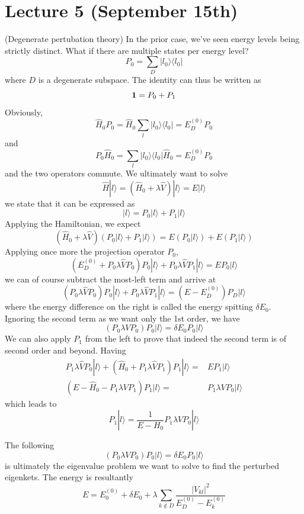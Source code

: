 \section{Lecture 5 (September 15th)}
\begin{defi}
(Degenerate pertubation theory) In the prior case, we've seen energy levels being strictly distinct. What if there are multiple states per energy level? 
\[P_{0}=\sum _{D}|l_{0}\rangle \langle l_{0}|\]
where $D$ is a degenerate subspace. The identity can thus be written as
\[{\bf 1}=P_0+P_1\]
Obviously,
\[\hat{H}_{0}P_0=\hat{H}_{0}\sum _{l}|l_{0}\rangle \langle l_{0}|=E_{D}^{(0)}P_0\]
and
\[P_0\hat{H}_{0}=\sum _{l}|l_0\rangle \langle l_0|\hat{H}_{0}=E_{D}^{(0)}P_0\]
and the two operators commute. We ultimately want to solve
\[\hat{H}|l\rangle =(\hat{H}_{0}+\lambda \hat{V})|l\rangle =E|l\rangle \]
we state that it can be expressed as
\[|l\rangle =P_0|l\rangle +P_{1}|l\rangle \]
Applying the Hamiltonian, we expect
\[(\hat{H}_{0}+\lambda \hat{V})(P_0|l\rangle+P_1|l\rangle )=E(P_0|l\rangle )+E(P_1|l\rangle ) \]
Applying once more the projection operator $P_0$,
\[(E_{D}^{(0)}+P_{0}\lambda \hat{V}P_0)P_0|l\rangle+P_0\lambda \hat{V}P_1|l\rangle=EP_0|l\rangle \]
we can of course subtract the most-left term and arrive at
\[(P_0\lambda \hat{V}P_0)P_0|l\rangle +P_0\lambda \hat{V}P_1|l\rangle =(E-E^{(0)}_{D})P_{D}|l\rangle \]
where the energy difference on the right is called the energy spitting $\delta E_0$. Ignoring the second term as we want only the 1st order, we have
\[(P_0\lambda VP_0)P_0|l\rangle =\delta E_{0}P_0|l\rangle \]
We can also apply $P_1$ from the left to prove that indeed the second term is of second order and beyond. Having
\[\begin{align*}
	P_1\lambda \hat{V}P_0|l\rangle +(\hat{H}_{0}+P_1\lambda \hat{V}P_1)P_1|l\rangle =&EP_1|l\rangle \\
	(E-\hat{H}_{0}-P_1\lambda VP_1)P_1|l\rangle =&P_1\lambda VP_0|l\rangle 
\end{align*}\]
which leads to
\[P_1|l\rangle =\dfrac{1}{E-H_0}P_1\lambda VP_0|l\rangle \]
\end{defi}
\vspace{2ex}
\begin{thm}The following
\[\boxed{(P_0\lambda VP_0)P_0|l\rangle =\delta E_0P_0|l\rangle }\]
is ultimately the eigenvalue problem we want to solve to find the perturbed eigenkets. The energy is resultantly
\[\boxed{E=E_0^{(0)}+\delta E_0+\lambda \sum _{k\notin D}\dfrac{|V_{kl}|^2}{E_{D}^{(0)}-E^{(0)}_{k}}}\]
\end{thm}
